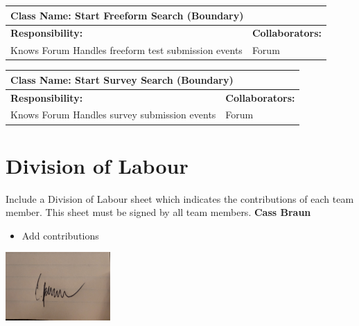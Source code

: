 \documentclass[]{article}
\begin{document}
	\begin{table}[H]
		\centering
		\begin{tabular}{|p{7cm}|p{7cm}|}
		\hline 
		 \multicolumn{2}{|l|}{\textbf{Class Name: Start Freeform Search (Boundary)}} \\
		\hline
		\textbf{Responsibility:} & \textbf{Collaborators:} \\
		\hline
		Knows Forum \newline
		Handles freeform test submission events & Forum \\
		\hline
		\end{tabular}
	\end{table}
	\begin{table}[H]
		\centering
		\begin{tabular}{|p{7cm}|p{7cm}|}
		\hline 
		 \multicolumn{2}{|l|}{\textbf{Class Name: Start Survey Search (Boundary)}} \\
		\hline
		\textbf{Responsibility:} & \textbf{Collaborators:} \\
		\hline
		Knows Forum \newline
		Handles survey submission events & Forum \\
		\hline
		\end{tabular}
	\end{table}
\FloatBarrier

\appendix
\section{Division of Labour}
\label{sec:division_of_labour}
Include a Division of Labour sheet which indicates the contributions of each team member. This sheet must be signed by all team members.
\newline
\newline
\textbf{Cass Braun}
\begin{itemize}
    \setlength\itemindent{2em}
\item Add contributions 
\end{itemize}
\includegraphics[width=0.3\textwidth]{Cass.jpg}
\end{document}

